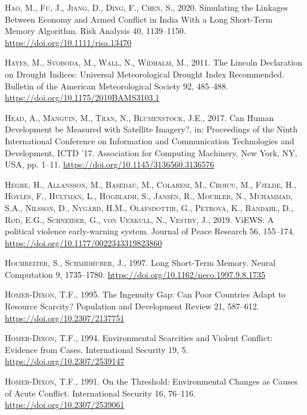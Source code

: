 \documentclass[a4paper,11pt]{article}
\begin{document}
\leavevmode\hypertarget{ref-hao2020a}{}%
\textsc{Hao, M., Fu, J., Jiang, D., Ding, F., Chen, S.}, 2020. Simulating the Linkages Between Economy and Armed Conflict in India With a Long Short-Term Memory Algorithm. Risk Analysis 40, 1139--1150. \url{https://doi.org/10.1111/risa.13470}

\leavevmode\hypertarget{ref-hayes2011}{}%
\textsc{Hayes, M., Svoboda, M., Wall, N., Widhalm, M.}, 2011. The Lincoln Declaration on Drought Indices: Universal Meteorological Drought Index Recommended. Bulletin of the American Meteorological Society 92, 485--488. \url{https://doi.org/10.1175/2010BAMS3103.1}

\leavevmode\hypertarget{ref-head2017}{}%
\textsc{Head, A., Manguin, M., Tran, N., Blumenstock, J.E.}, 2017. Can Human Development be Measured with Satellite Imagery?, in: Proceedings of the Ninth International Conference on Information and Communication Technologies and Development, ICTD '17. Association for Computing Machinery, New York, NY, USA, pp. 1--11. \url{https://doi.org/10.1145/3136560.3136576}

\leavevmode\hypertarget{ref-hegre2019}{}%
\textsc{Hegre, H., Allansson, M., Basedau, M., Colaresi, M., Croicu, M., Fjelde, H., Hoyles, F., Hultman, L., Högbladh, S., Jansen, R., Mouhleb, N., Muhammad, S.A., Nilsson, D., Nygård, H.M., Olafsdottir, G., Petrova, K., Randahl, D., Rød, E.G., Schneider, G., von Uexkull, N., Vestby, J.}, 2019. ViEWS: A political violence early-warning system. Journal of Peace Research 56, 155--174. \url{https://doi.org/10.1177/0022343319823860}

\leavevmode\hypertarget{ref-hochreiter1997}{}%
\textsc{Hochreiter, S., Schmidhuber, J.}, 1997. Long Short-Term Memory. Neural Computation 9, 1735--1780. \url{https://doi.org/10.1162/neco.1997.9.8.1735}

\leavevmode\hypertarget{ref-homerdixon1995}{}%
\textsc{Homer-Dixon, T.F.}, 1995. The Ingenuity Gap: Can Poor Countries Adapt to Resource Scarcity? Population and Development Review 21, 587--612. \url{https://doi.org/10.2307/2137751}

\leavevmode\hypertarget{ref-homerdixon1994}{}%
\textsc{Homer-Dixon, T.F.}, 1994. Environmental Scarcities and Violent Conflict: Evidence from Cases. International Security 19, 5. \url{https://doi.org/10.2307/2539147}

\leavevmode\hypertarget{ref-homerdixon1991}{}%
\textsc{Homer-Dixon, T.F.}, 1991. On the Threshold: Environmental Changes as Causes of Acute Conflict. International Security 16, 76--116. \url{https://doi.org/10.2307/2539061}
\end{document}
